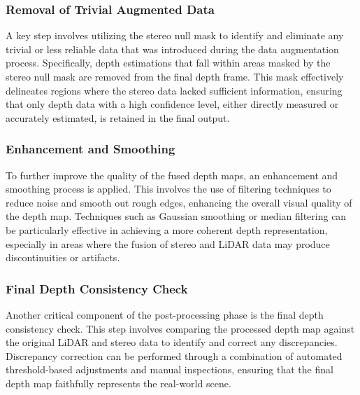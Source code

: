 \documentclass[conference]{IEEEtran}
\begin{document}
\subsubsection{Removal of Trivial Augmented Data}

A key step involves utilizing the stereo null mask to identify and eliminate any trivial or less reliable data that was introduced during the data augmentation process. Specifically, depth estimations that fall within areas masked by the stereo null mask are removed from the final depth frame. This mask effectively delineates regions where the stereo data lacked sufficient information, ensuring that only depth data with a high confidence level, either directly measured or accurately estimated, is retained in the final output.

\subsubsection{Enhancement and Smoothing}

To further improve the quality of the fused depth maps, an enhancement and smoothing process is applied. This involves the use of filtering techniques to reduce noise and smooth out rough edges, enhancing the overall visual quality of the depth map. Techniques such as Gaussian smoothing or median filtering can be particularly effective in achieving a more coherent depth representation, especially in areas where the fusion of stereo and LiDAR data may produce discontinuities or artifacts.

\subsubsection{Final Depth Consistency Check}

Another critical component of the post-processing phase is the final depth consistency check. This step involves comparing the processed depth map against the original LiDAR and stereo data to identify and correct any discrepancies. Discrepancy correction can be performed through a combination of automated threshold-based adjustments and manual inspections, ensuring that the final depth map faithfully represents the real-world scene.


\end{document}
